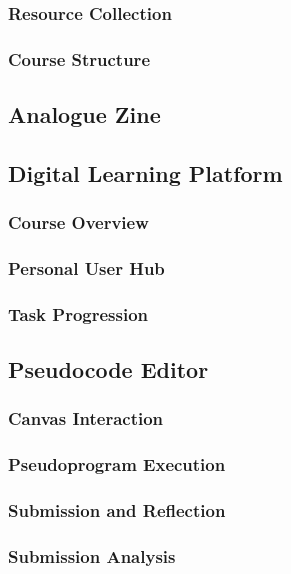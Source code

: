 \subsubsection{Resource Collection}
\subsubsection{Course Structure}
\subsection{Analogue Zine}
\subsection{Digital Learning Platform}
\subsubsection{Course Overview}
\subsubsection{Personal User Hub}
\subsubsection{Task Progression}
\subsection{Pseudocode Editor}
\subsubsection{Canvas Interaction}
\subsubsection{Pseudoprogram Execution}
\subsubsection{Submission and Reflection}
\subsubsection{Submission Analysis}